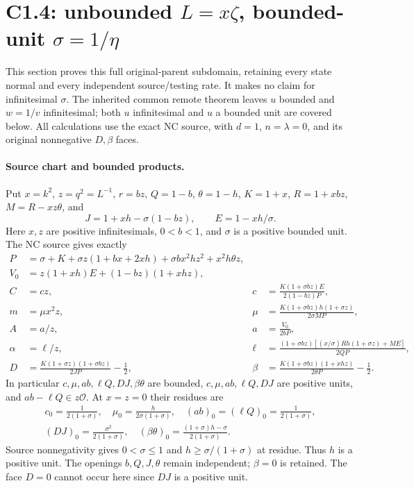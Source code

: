 \section[C1.4: unbounded L, bounded-unit sigma]{C1.4: unbounded $L=x\zeta$, bounded-unit $\sigma=1/\eta$}
\label{sec:c14-large-l-unit}
This section proves this full original-parent subdomain, retaining every
state normal and every independent source/testing rate. It makes no claim
for infinitesimal $\sigma$. The inherited common remote theorem leaves
$u$ bounded and $w=1/v$ infinitesimal; both $u$ infinitesimal and $u$ a
bounded unit are covered below. All calculations use the exact NC source,
with $d=1$, $n=\lambda=0$, and its original nonnegative $D,\beta$ faces.

\paragraph{Source chart and bounded products.}
Put $x=k^2$, $z=q^2=L^{-1}$, $r=bz$, $Q=1-b$, $\theta=1-h$,
$K=1+x$, $R=1+xbz$, $M=R-xz\theta$, and
\[
 J=1+xh-\sigma(1-bz),\qquad E=1-xh/\sigma.
\]
Here $x,z$ are positive infinitesimals, $0<b<1$, and $\sigma$ is a positive
bounded unit. The NC source gives exactly
\begin{align*}
 P&=\sigma+K+\sigma z(1+bx+2xh)+\sigma bx^2hz^2+x^2h\theta z,\\
 V_0&=z(1+xh)E+(1-bz)(1+xhz),\\
 C&=cz,&c&=\frac{K(1+\sigma bz)E}{2(1-bz)P},\\
 m&=\mu x^2z,&\mu&=\frac{K(1+\sigma bz)h(1+\sigma z)}{2\sigma MP},\\
 A&=a/z,&a&=\frac{V_0}{2bP},\\
 \alpha&=\ell/z,&\ell&=\frac{(1+\sigma bz)[(x/\sigma)Rh(1+\sigma z)+ME]}{2QP},\\
 D&=\frac{K(1+\sigma z)(1+\sigma bz)}{2JP}-\frac12,&
 \beta&=\frac{K(1+\sigma bz)(1+xhz)}{2\theta P}-\frac12.
\end{align*}
In particular $c,\mu,ab,\ell Q,DJ,\beta\theta$ are bounded,
$c,\mu,ab,\ell Q,DJ$ are positive units, and $ab-\ell Q\in z\mathcal O$.
At $x=z=0$ their residues are
\[
\begin{gathered}
c_0=\frac1{2(1+\sigma)},\quad
\mu_0=\frac h{2\sigma(1+\sigma)},\quad
(ab)_0=(\ell Q)_0=\frac1{2(1+\sigma)},\\
(DJ)_0=\frac{\sigma^2}{2(1+\sigma)},\quad
(\beta\theta)_0=\frac{(1+\sigma)h-\sigma}{2(1+\sigma)}.
\end{gathered}
\]
Source nonnegativity gives $0<\sigma\leq1$ and
$h\geq\sigma/(1+\sigma)$ at residue. Thus $h$ is a positive unit.
The openings $b,Q,J,\theta$ remain independent; $\beta=0$ is retained.
The face $D=0$ cannot occur here since $DJ$ is a positive unit.

